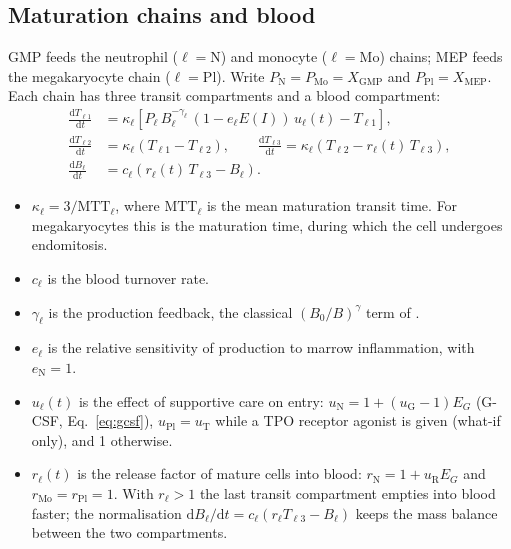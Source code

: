 \documentclass[11pt]{article}
\newcommand{\dd}{\mathrm{d}}
\newcommand{\X}[1]{X_{\mathrm{#1}}}
\begin{document}
\subsection{Maturation chains and blood}\label{sec:chains}
GMP feeds the neutrophil ($\ell=\mathrm{N}$) and monocyte ($\ell=\mathrm{Mo}$) chains; MEP feeds the megakaryocyte chain ($\ell=\mathrm{Pl}$). Write $P_{\mathrm{N}}=P_{\mathrm{Mo}}=\X{GMP}$ and $P_{\mathrm{Pl}}=\X{MEP}$. Each chain has three transit compartments and a blood compartment:
\begin{align}
\frac{\dd T_{\ell1}}{\dd t} &= \kappa_\ell\left[P_\ell\, B_\ell^{-\gamma_\ell}\,(1-e_\ell E(I))\,u_\ell(t) - T_{\ell1}\right], \label{eq:chain1}\\
\frac{\dd T_{\ell2}}{\dd t} &= \kappa_\ell\left(T_{\ell1}-T_{\ell2}\right), \qquad
\frac{\dd T_{\ell3}}{\dd t} = \kappa_\ell\left(T_{\ell2}-r_\ell(t)\,T_{\ell3}\right), \label{eq:chain2}\\
\frac{\dd B_\ell}{\dd t} &= c_\ell\left(r_\ell(t)\,T_{\ell3}-B_\ell\right). \label{eq:blood}
\end{align}
\begin{itemize}
\item $\kappa_\ell=3/\mathrm{MTT}_\ell$, where $\mathrm{MTT}_\ell$ is the mean maturation transit time. For megakaryocytes this is the maturation time, during which the cell undergoes endomitosis.
\item $c_\ell$ is the blood turnover rate.
\item $\gamma_\ell$ is the production feedback, the classical $(B_0/B)^{\gamma}$ term of \citet{friberg2002}.
\item $e_\ell$ is the relative sensitivity of production to marrow inflammation, with $e_{\mathrm{N}}=1$.
\item $u_\ell(t)$ is the effect of supportive care on entry: $u_{\mathrm{N}}=1+(u_{\mathrm{G}}-1)E_G$ (G-CSF, Eq.~\ref{eq:gcsf}), $u_{\mathrm{Pl}}=u_{\mathrm{T}}$ while a TPO receptor agonist is given (what-if only), and 1 otherwise.
\item $r_\ell(t)$ is the release factor of mature cells into blood: $r_{\mathrm{N}}=1+u_{\mathrm{R}}E_G$ and $r_{\mathrm{Mo}}=r_{\mathrm{Pl}}=1$. With $r_\ell>1$ the last transit compartment empties into blood faster; the normalisation $\dd B_\ell/\dd t=c_\ell(r_\ell T_{\ell3}-B_\ell)$ keeps the mass balance between the two compartments.
\end{itemize}
\end{document}
